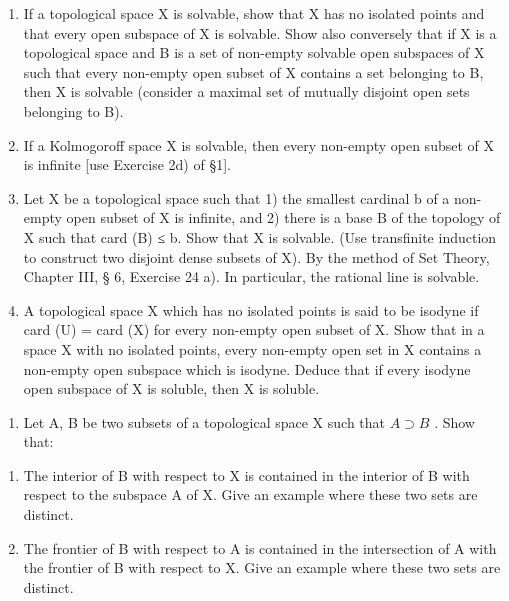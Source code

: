 \begin{enumerate}
\def\labelenumi{\alph{enumi})}
\item
  If a topological space X is solvable, show that X has no isolated points and that every open subspace of X is solvable. Show also conversely that if X is a topological space and B is a set of non-empty solvable open subspaces of X such that every non-empty open subset of X contains a set belonging to B, then X is solvable (consider a maximal set of mutually disjoint open sets belonging to B).
\item
  If a Kolmogoroff space X is solvable, then every non-empty open subset of X is infinite {[}use Exercise 2d) of §1{]}.
\item
  Let X be a topological space such that 1) the smallest cardinal b of a non-empty open subset of X is infinite, and 2) there is a base B of the topology of X such that card (B) ≤ b. Show that X is solvable. (Use transfinite induction to construct two disjoint dense subsets of X). By the method of Set Theory, Chapter III, § 6, Exercise 24 a). In particular, the rational line is solvable.
\item
  A topological space X which has no isolated points is said to be isodyne if card (U) = card (X) for every non-empty open subset of X. Show that in a space X with no isolated points, every non-empty open set in X contains a non-empty open subspace which is isodyne. Deduce that if every isodyne open subspace of X is soluble, then X is soluble.
\end{enumerate}

\BourbakiExerciseGroup

\begin{enumerate}
\def\labelenumi{\arabic{enumi})}
\tightlist
\item
  Let A, B be two subsets of a topological space X such that \(A \supset B\) . Show that:
\end{enumerate}

\begin{enumerate}
\def\labelenumi{\alph{enumi})}
\item
  The interior of B with respect to X is contained in the interior of B with respect to the subspace A of X. Give an example where these two sets are distinct.
\item
  The frontier of B with respect to A is contained in the intersection of A with the frontier of B with respect to X. Give an example where these two sets are distinct.
\end{enumerate}

